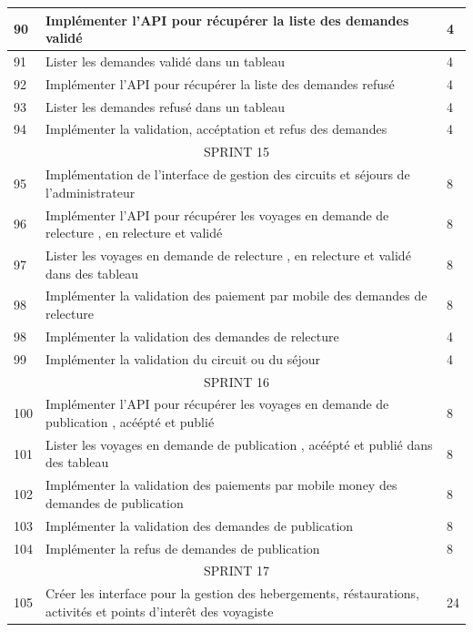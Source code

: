 \documentclass[12pt]{report}
\begin{document}
\begin{longtable}{|p{1cm}|p{7cm}|p{6cm}|}
						\hline
						90 & Implémenter l'API pour récupérer la liste des demandes validé & 4\\
						\hline
						91 & Lister les demandes validé dans un tableau & 4\\
						\hline
						92 & Implémenter l'API pour récupérer la liste des demandes refusé & 4\\
						\hline
						93 & Lister les demandes refusé dans un tableau & 4\\
						\hline
						94 & Implémenter la validation, accéptation et refus des demandes & 4\\
						\hline
						\multicolumn{3}{|c|}{SPRINT 15}\\
						\hline							
						95 & Implémentation de l'interface de gestion des circuits et séjours de l'administrateur & 8\\
						\hline
						96 & Implémenter l'API pour récupérer les voyages en demande de relecture , en relecture et validé & 8\\
						\hline
						97 & Lister les voyages  en demande de relecture , en relecture et validé dans des tableau & 8\\
						\hline
						98 & Implémenter la validation des paiement par mobile des demandes de relecture & 8\\
						\hline 
						98 & Implémenter la validation des demandes de relecture & 4\\
						\hline 
						99 & Implémenter la validation du circuit ou du séjour & 4\\
						\hline
						\multicolumn{3}{|c|}{SPRINT 16}\\
						\hline
						100 & Implémenter l'API pour récupérer les voyages en demande de publication , acéépté et publié & 8\\
						\hline
						101 & Lister les voyages  en demande de publication , acéépté et publié  dans des tableau & 8\\
						\hline
						102 & Implémenter la validation des paiements par mobile money des demandes de publication & 8\\
						\hline
						103 & Implémenter la validation des demandes de publication & 8\\
						\hline
						104 & Implémenter la refus de demandes de publication & 8\\
						\hline
						\multicolumn{3}{|c|}{SPRINT 17}\\
						\hline
						105 & Créer les interface pour la gestion des hebergements, réstaurations, activités et points d'interêt des voyagiste & 24\\

\end{longtable}
\end{document}
